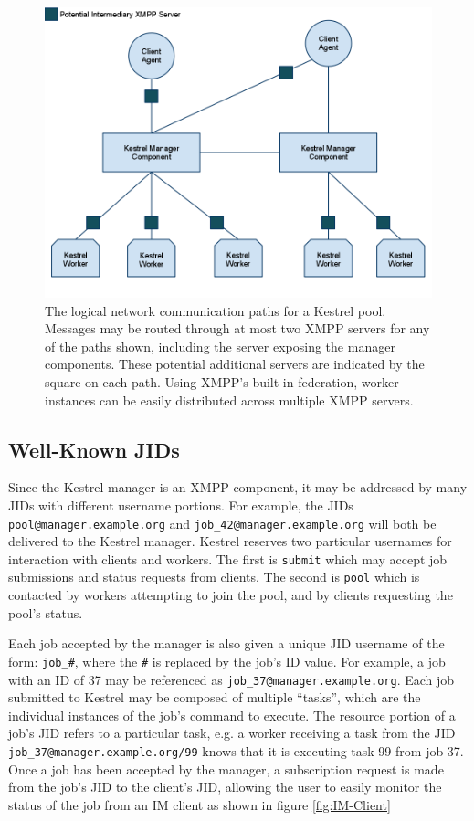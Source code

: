 \begin{figure}
\includegraphics[width=\columnwidth]{figures/kestrel_network}
\caption{The logical network communication paths for a Kestrel pool. Messages
may be routed through at most two XMPP servers for any of the paths shown, 
including the server exposing the manager components. These potential additional
servers are indicated by the square on each path. Using XMPP's built-in federation,
worker instances can be easily distributed across multiple XMPP servers.}
\end{figure}

\subsection{Well-Known JIDs}
Since the Kestrel manager is an XMPP component, it may be addressed by many JIDs
with different username portions. For example, the JIDs \texttt{pool@manager.example.org}
and \texttt{job\_42@manager.example.org} will both be delivered to the Kestrel
manager. Kestrel reserves two particular usernames for interaction with clients
and workers. The first is \texttt{submit} which may accept job submissions and
status requests from clients. The second is \texttt{pool} which is contacted
by workers attempting to join the pool, and by clients requesting the pool's
status.

Each job accepted by the manager is also given a unique JID username of
the form: \texttt{job\_\#}, where the \texttt{\#} is replaced by the
job's ID value. For example, a job with an ID of 37 may be referenced as
\texttt{job\_37@manager.example.org}. Each job submitted to Kestrel may
be composed of multiple ``tasks'', which are the individual instances
of the job's command to execute. The resource portion of a job's JID
refers to a particular task, e.g. a worker receiving a task from the JID
\texttt{job\_37@manager.example.org/99} knows that it is executing task 99 from
job 37. Once a job has been accepted by the manager, a subscription request is
made from the job's JID to the client's JID, allowing the user to easily monitor
the status of the job from an IM client as shown in figure \ref{fig:IM-Client}

